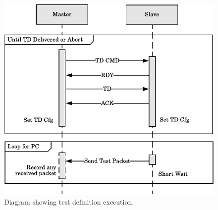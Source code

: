 \begin{figure}[H]
    \centering
    \includegraphics{Figures/software_testdef_execution.pdf}
    \caption[Master-Slave test definition execution method]{Diagram showing test definition execution.}
    \label{fig:software_testdef_execution}
\end{figure}




%
%
% 
%
%
%
%
%    
